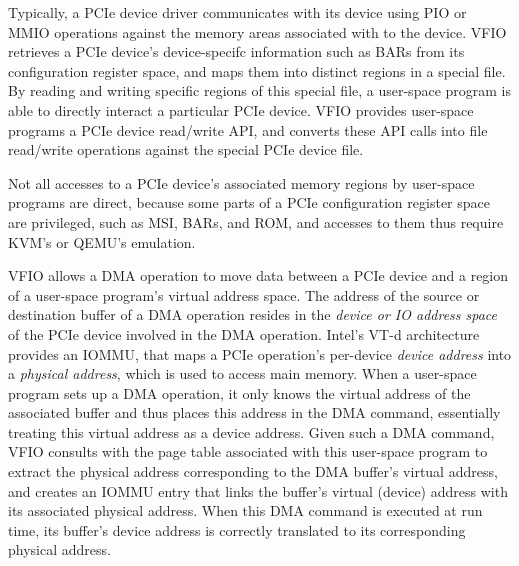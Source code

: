 Typically, a PCIe device driver communicates with its device using PIO or
MMIO operations against the memory areas associated with to the device. 
VFIO retrieves a PCIe device's device-specifc information such as BARs from its
configuration register space, and maps them into distinct regions in a special file. 
By reading and writing specific regions of this special file, a user-space program 
is able to directly interact a particular PCIe device. 
VFIO provides user-space programs a PCIe device read/write API, and converts these API calls
into file read/write operations against the special PCIe device file.
%

Not all accesses to a PCIe device's associated memory regions by user-space programs are direct, 
because some parts of a PCIe configuration register space are privileged, such as MSI, BARs, and ROM,  and accesses to them 
thus require KVM's or QEMU's emulation. 

VFIO allows a DMA operation to move data between a PCIe device and 
a region of a user-space program's virtual address space.
The address of the source or destination buffer of a DMA operation resides in the {\em device or IO address space} of the PCIe device involved in the DMA operation.
Intel's VT-d architecture provides an IOMMU, that maps a PCIe operation's per-device {\em device address} into a {\em physical address}, which is used to access main memory.
When a user-space program sets up a DMA operation, it only knows the virtual address of the associated buffer and thus places
this address in the DMA command, essentially treating this virtual address as a device address. 
Given such a DMA command, VFIO consults with the page table associated with this user-space program to extract the physical address corresponding
to the DMA buffer's virtual address, and creates an IOMMU entry that links the buffer's virtual (device) address with its associated physical address. 
When this DMA command is executed at run time, its buffer's device address is correctly translated to its corresponding physical address.
   
